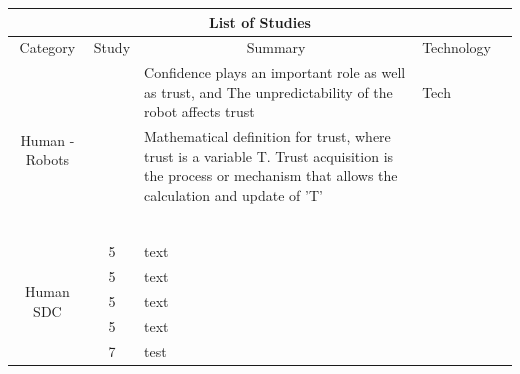\documentclass[runningheads,a4paper]{llncs}
\begin{document}
\begin{longtable}{|c|c|p{5cm}|p{3cm}|p{1cm}|}
\hline
\multicolumn{5}{|c|}{List of Studies}                                                                                               \\ \hline
Category                        & Study & \multicolumn{1}{c|}{Summary}    & \multicolumn{1}{c|}{Technology} & \multicolumn{1}{c|}{} \\ \hline
\multirow{8}{*}{Human - Robots} 
	& \cite{stormont2008analyzing}    
	&  Confidence plays an important role as well as trust, and The unpredictability of the robot affects trust  
	& Tech                            
	&                       
	\\ \cline{2-5} 
	& \cite{esfandiari2001agents}     
	& Mathematical definition for trust, where trust is a variable T. Trust acquisition is the process or mechanism that allows the calculation and update of 'T'
	&                                 
	&                       
	\\ \cline{2-5} 
	&    
	& 
	&                                 
	&
	\\ \cline{2-5}
	&    
	& 
	&                                 
	&
	\\ \cline{2-5} 
	&    
	& 
	&                                 
	&
	\\ \cline{2-5} 
	&    
	& 
	&                                 
	&
	\\ \cline{2-5} 
	&    
	& 
	&                                 
	&
	\\ \cline{2-5} 
	&    
	& 
	&                                 
	&           
	\\ \hline
\multirow{5}{*}{Human SDC}      
	& 5     
	& text                            
	&                                 
	&                       
	\\ \cline{2-5} 
	& 5     
	& text                            
	&                                 
	&                       
	\\ \cline{2-5} 
	& 5     
	& text                            
	&                                 
	&                       
	\\ \cline{2-5} 
	& 5     
	& text                            
	&                                 
	&                       
	\\ \cline{2-5} 
	& 7     
	& test                            
	&                                 
	&                       
	\\ \hline
	

\end{longtable}
\end{document}
